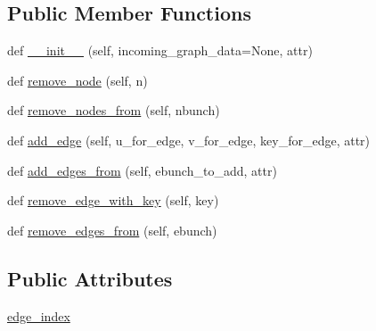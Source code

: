 \subsection*{Public Member Functions}
\begin{DoxyCompactItemize}
\item 
def \hyperlink{classnetworkx_1_1algorithms_1_1tree_1_1branchings_1_1MultiDiGraph__EdgeKey_a66fc427388e7410222ca3b593d560a16}{\+\_\+\+\_\+init\+\_\+\+\_\+} (self, incoming\+\_\+graph\+\_\+data=None, attr)
\item 
def \hyperlink{classnetworkx_1_1algorithms_1_1tree_1_1branchings_1_1MultiDiGraph__EdgeKey_a17958c412b07ed8a17269ad01f8cb772}{remove\+\_\+node} (self, n)
\item 
def \hyperlink{classnetworkx_1_1algorithms_1_1tree_1_1branchings_1_1MultiDiGraph__EdgeKey_a4a33e56303575f32c322406248f7246d}{remove\+\_\+nodes\+\_\+from} (self, nbunch)
\item 
def \hyperlink{classnetworkx_1_1algorithms_1_1tree_1_1branchings_1_1MultiDiGraph__EdgeKey_afb3f4a64aad72254a25e999fec36766b}{add\+\_\+edge} (self, u\+\_\+for\+\_\+edge, v\+\_\+for\+\_\+edge, key\+\_\+for\+\_\+edge, attr)
\item 
def \hyperlink{classnetworkx_1_1algorithms_1_1tree_1_1branchings_1_1MultiDiGraph__EdgeKey_aad69506b8938d062a4ca6b9e916095b9}{add\+\_\+edges\+\_\+from} (self, ebunch\+\_\+to\+\_\+add, attr)
\item 
def \hyperlink{classnetworkx_1_1algorithms_1_1tree_1_1branchings_1_1MultiDiGraph__EdgeKey_a7cb1ebaa2e4d4af0555b6455b225ec2c}{remove\+\_\+edge\+\_\+with\+\_\+key} (self, key)
\item 
def \hyperlink{classnetworkx_1_1algorithms_1_1tree_1_1branchings_1_1MultiDiGraph__EdgeKey_a8cac9343b11e556049a8800dc31809d2}{remove\+\_\+edges\+\_\+from} (self, ebunch)
\end{DoxyCompactItemize}
\subsection*{Public Attributes}
\begin{DoxyCompactItemize}
\item 
\hyperlink{classnetworkx_1_1algorithms_1_1tree_1_1branchings_1_1MultiDiGraph__EdgeKey_a1c203852a83bee02b82ace5a1de12244}{edge\+\_\+index}
\end{DoxyCompactItemize}


